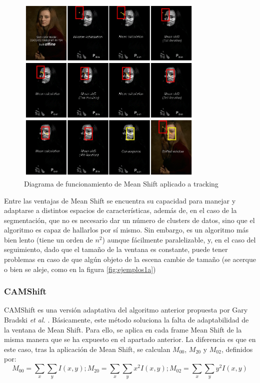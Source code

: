 \begin{figure}
    \centering
    \includegraphics[width=0.8\textwidth]{images/meanshift}
    \caption{Diagrama de funcionamiento de Mean Shift aplicado a tracking}
    \label{fig:meanshiftopencv}
\end{figure}


Entre las ventajas de Mean Shift se encuentra su capacidad para manejar y adaptarse a distintos espacios de características, además de, en el caso de la segmentación, que no es necesario dar un número de clusters de datos, sino que el algoritmo es capaz de hallarlos por sí mismo. Sin embargo, es un algoritmo más bien lento (tiene un orden de $n^2$) aunque fácilmente paralelizable, y, en el caso del seguimiento, dado que el tamaño de la ventana es constante, puede tener problemas en caso de que algún objeto de la escena cambie de tamaño (se acerque o bien se aleje, como en la figura \ref{fig:ejemplos1a})

\subsubsection*{CAMShift}

CAMShift es una versión adaptativa del algoritmo anterior propuesta por Gary Bradski \textit{et al.} \cite{art:camshift}. Básicamente, este método soluciona la falta de adaptabilidad de la ventana de Mean Shift. Para ello, se aplica en cada frame Mean Shift de la misma manera que se ha expuesto en el apartado anterior. La diferencia es que en este caso, tras la aplicación de Mean Shift, se calculan $M_{00}$, $M_{20}$ y $M_{02}$, definidos por:
\[
  M_{00} = \sum_x \sum_y I(x,y) ; M_{20} = \sum_x \sum_y x^2 I(x,y) ; M_{02} = \sum_x \sum_y y^2 I(x,y)
\]

